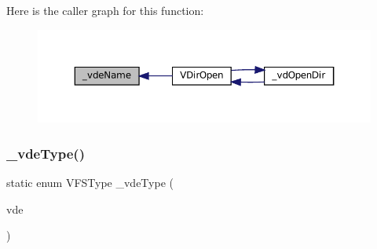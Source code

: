 Here is the caller graph for this function\+:
\nopagebreak
\begin{figure}[H]
\begin{center}
\leavevmode
\includegraphics[width=350pt]{vfs-dirent_8c_a13ca1b5e641080df5395524454ec2dd1_icgraph}
\end{center}
\end{figure}
\mbox{\label{vfs-dirent_8c_a81778a0511632136f6bfb33d00cba047}} 
\subsubsection{\texorpdfstring{\+\_\+vde\+Type()}{\_vdeType()}}
{\footnotesize\ttfamily static enum V\+F\+S\+Type \+\_\+vde\+Type (\begin{DoxyParamCaption}\item[{struct V\+Dir\+Entry $\ast$}]{vde }\end{DoxyParamCaption})\hspace{0.3cm}{\ttfamily [static]}}

